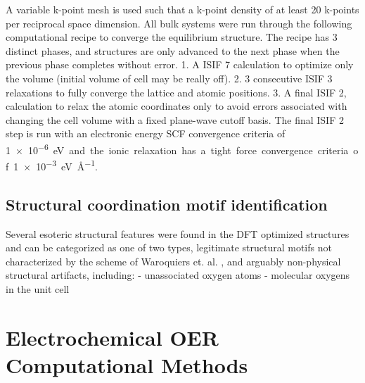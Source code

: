 %
A variable k-point mesh is used such that a k-point density of at least \num{20} k-points per reciprocal space dimension.
%
All bulk systems were run through the following computational recipe to converge the equilibrium structure.
%
The recipe has \num{3} distinct phases, and structures are only advanced to the next phase when the previous phase completes without error.
%
1. A ISIF \num{7} calculation to optimize only the volume (initial volume of cell may be really off).
%
2. \num{3} consecutive ISIF \num{3} relaxations to fully converge the lattice and atomic positions.
%
3. A final ISIF \num{2}, calculation to relax the atomic coordinates only to avoid errors associated with changing the cell volume with a fixed plane-wave cutoff basis.
%
The final ISIF \num{2} step is run with an electronic energy SCF convergence criteria of \SI{1e-6} eV and the ionic relaxation has a tight force convergence criteria of \SI{1e-3}{\electronvolt\per\angstrom}.


\subsection{Structural coordination motif identification}  %
%
Several esoteric structural features were found in the DFT optimized structures and can be categorized as one of two types,
legitimate structural motifs not characterized by the scheme of Waroquiers et. al. \cite{Waroquiers2017}, and arguably non-physical structural artifacts, including:
- unassociated oxygen atoms
- molecular oxygens in the unit cell




\section{Electrochemical OER Computational Methods}  %
%

